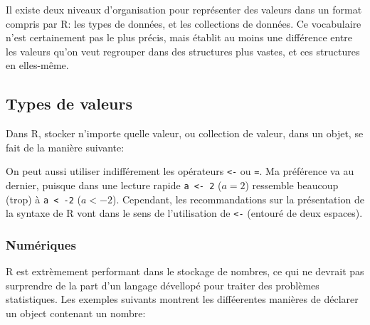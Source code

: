 Il existe deux niveaux d'organisation pour représenter des valeurs dans un format compris par R: les types de données, et les collections de données.
Ce vocabulaire n'est certainement pas le plus précis, mais établit au moins une différence entre les valeurs qu'on veut regrouper dans des structures plus vastes, et ces structures en elles-même.

\subsection{Types de valeurs}

Dans R, stocker n'importe quelle valeur, ou collection de valeur, dans un objet, se fait de la manière suivante:

\begin{knitrout}
\color{fgcolor}\begin{kframe}
\begin{flushleft}
\ttfamily\noindent
{}\hlassignement{\usebox{\hlnormalsizeboxlessthan}-}{\ }\mbox{}
\normalfont
\end{flushleft}
\end{kframe}
\end{knitrout}


On peut aussi utiliser indifférement les opérateurs \texttt{<-} ou \texttt{=}.
Ma préférence va au dernier, puisque dans une lecture rapide \texttt{a <- 2} ($a = 2$) ressemble beaucoup (trop) à \texttt{a < -2} ($a < -2$).
Cependant, les recommandations sur la présentation de la syntaxe de R vont dans le sens de l'utilisation de \texttt{<-} (entouré de deux espaces). 

\subsubsection{Numériques}

R est extrèmement performant dans le stockage de nombres, ce qui ne devrait pas surprendre de la part d'un langage dévellopé pour traiter des problèmes statistiques.
Les exemples suivants montrent les difféerentes manières de déclarer un object contenant un nombre:

